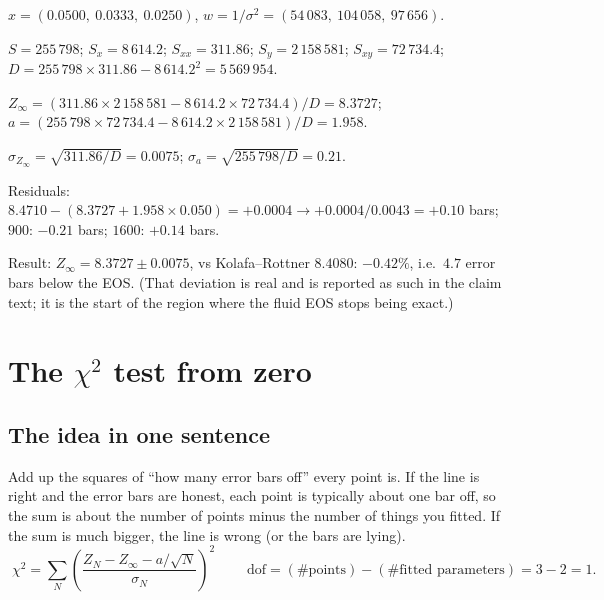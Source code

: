 \documentclass[11pt,a4paper]{article}
\begin{document}
\begin{num}
$x = (0.0500,\ 0.0333,\ 0.0250)$, $w = 1/\sigma^2 = (54\,083,\ 104\,058,\ 97\,656)$.

$S = 255\,798$; $S_x = 8\,614.2$; $S_{xx} = 311.86$; $S_y = 2\,158\,581$; $S_{xy} = 72\,734.4$; $D = 255\,798\times311.86 - 8\,614.2^2 = 5\,569\,954$.

$Z_\infty = (311.86\times2\,158\,581 - 8\,614.2\times72\,734.4)/D = 8.3727$; $a = (255\,798\times72\,734.4 - 8\,614.2\times2\,158\,581)/D = 1.958$.

$\sigma_{Z_\infty} = \sqrt{311.86/D} = 0.0075$; $\sigma_a = \sqrt{255\,798/D} = 0.21$.

Residuals: $8.4710 - (8.3727 + 1.958\times0.050) = +0.0004 \to +0.0004/0.0043 = +0.10$ bars; $900$: $-0.21$ bars; $1600$: $+0.14$ bars.

Result: $Z_\infty = 8.3727\pm0.0075$, vs Kolafa--Rottner $8.4080$: $-0.42\%$, i.e.\ $4.7$ error bars below the EOS. (That deviation is real and is reported as such in the claim text; it is the start of the region where the fluid EOS stops being exact.)
\end{num}

\section{The \texorpdfstring{$\chi^2$}{chi-squared} test from zero}

\subsection{The idea in one sentence}
\begin{eli}
Add up the squares of ``how many error bars off'' every point is. If the line is right and the error bars are honest, each point is typically about one bar off, so the sum is about the number of points minus the number of things you fitted. If the sum is much bigger, the line is wrong (or the bars are lying).
\begin{equation}
\boxed{\;\chi^2 = \sum_{N}\left(\frac{Z_N - Z_\infty - a/\sqrt N}{\sigma_N}\right)^2\;}
\qquad \text{dof} = (\#\text{points}) - (\#\text{fitted parameters}) = 3 - 2 = 1 .
\end{equation}
\end{eli}
\end{document}
